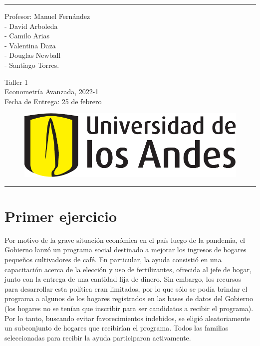 \documentclass[a4paper]{article}
\begin{document}

\fancyhead[C]{}
\hrule \medskip 
\begin{minipage}{0.295\textwidth} 
\raggedright
Profesor: Manuel Fernández\\
\vspace{2mm}
- David Arboleda\\
- Camilo Arias\\
- Valentina Daza\\
- Douglas Newball\\
- Santiago Torres.
\end{minipage}
\begin{minipage}{0.4\textwidth} 
\centering 
\huge 
Taller 1\\ 
\vspace{2mm}
\normalsize 
Econometría Avanzada, 2022-1\\ 
Fecha de Entrega: 25 de febrero
\end{minipage}
\begin{minipage}{0.295\textwidth} 
\begin{figure}[H]
\raggedleft
\includegraphics[scale=0.3]{uniandes.pdf}
\end{figure}
\hfill
\end{minipage}
\medskip\hrule 
\bigskip


\section*{Primer ejercicio}
Por motivo de la grave situación económica en el país luego de la pandemia, el Gobierno lanzó un programa social destinado a mejorar los ingresos de hogares pequeños cultivadores de café. En particular, la ayuda consistió en una capacitación acerca de la elección y uso de fertilizantes, ofrecida al jefe de hogar, junto con la entrega de una cantidad fija de dinero. Sin embargo, los recursos para desarrollar esta política eran limitados, por lo que sólo se podía brindar el programa a algunos de los hogares registrados en las bases de datos del Gobierno (los hogares no se tenían que inscribir para ser candidatos a recibir el programa). Por lo tanto, buscando evitar favorecimientos indebidos, se eligió aleatoriamente un subconjunto de hogares que recibirían el programa.  Todos las familias seleccionadas para recibir la ayuda  participaron activamente.\\
\end{document}
